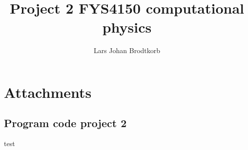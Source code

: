 \documentclass[10pt,a4paper]{article}
\begin{document}
\title{Project 2 FYS4150 computational physics}
\author{Lars Johan Brodtkorb}
\maketitle


\tableofcontents
\newpage




\section{Attachments}
\subsection{Program code project 2}
\label{sec:programcode_1}



test
\end{document}
